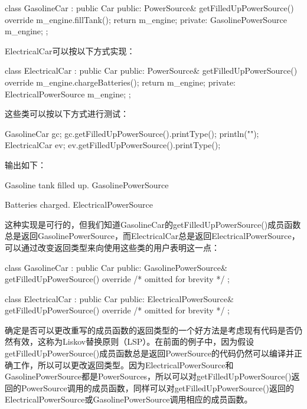 \begin{cpp}
class GasolineCar : public Car
{
    public:
        PowerSource& getFilledUpPowerSource() override
        {
            m_engine.fillTank();
            return m_engine;
        }
    private:
        GasolinePowerSource m_engine;
};
\end{cpp}

ElectricalCar可以按以下方式实现：

\begin{cpp}
class ElectricalCar : public Car
{
    public:
        PowerSource& getFilledUpPowerSource() override
        {
            m_engine.chargeBatteries();
            return m_engine;
        }
    private:
        ElectricalPowerSource m_engine;
};
\end{cpp}

这些类可以按以下方式进行测试：

\begin{cpp}
GasolineCar gc;
gc.getFilledUpPowerSource().printType();
println("");
ElectricalCar ev;
ev.getFilledUpPowerSource().printType();
\end{cpp}

输出如下：

\begin{shell}
Gasoline tank filled up.
GasolinePowerSource

Batteries charged.
ElectricalPowerSource
\end{shell}

这种实现是可行的，但我们知道GasolineCar的getFilledUpPowerSource()成员函数总是返回GasolinePowerSource，而ElectricalCar总是返回ElectricalPowerSource，可以通过改变返回类型来向使用这些类的用户表明这一点：

\begin{cpp}
class GasolineCar : public Car
{
    public:
    GasolinePowerSource& getFilledUpPowerSource() override
    { /* omitted for brevity */ }
};

class ElectricalCar : public Car
{
    public:
    ElectricalPowerSource& getFilledUpPowerSource() override
    { /* omitted for brevity */ }
};
\end{cpp}

确定是否可以更改重写的成员函数的返回类型的一个好方法是考虑现有代码是否仍然有效，这称为Liskov替换原则（LSP）。在前面的例子中，因为假设getFilledUpPowerSource()成员函数总是返回PowerSource的代码仍然可以编译并正确工作，所以可以更改返回类型。因为ElectricalPowerSource和GasolinePowerSource都是PowerSources，所以可以对getFilledUpPowerSource()返回的PowerSource调用的成员函数，同样可以对getFilledUpPowerSource()返回的ElectricalPowerSource或GasolinePowerSource调用相应的成员函数。

